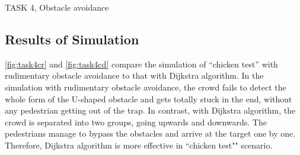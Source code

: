 \documentclass[10pt,a4paper]{article}
\begin{document}
\begin{task}{TASK 4, Obstacle avoidance}
\subsection{Results of Simulation}

\autoref{fig:task4cr} and \autoref{fig:task4cd} compare the simulation of ``chicken test'' with rudimentary obstacle avoidance to that with Dijkstra algorithm. In the simulation with rudimentary obstacle avoidance, the crowd fails to detect the whole form of the U-shaped obstacle and gets totally stuck in the end, without any pedestrian getting out of the trap. In contrast, with Dijkstra algorithm, the crowd is separated into two groups, going upwards and downwards. The pedestrians manage to bypass the obstacles and arrive at the target one by one. Therefore, Dijkstra algorithm is more effective in ``chicken test"" scenario.




\end{task}
\end{document}
